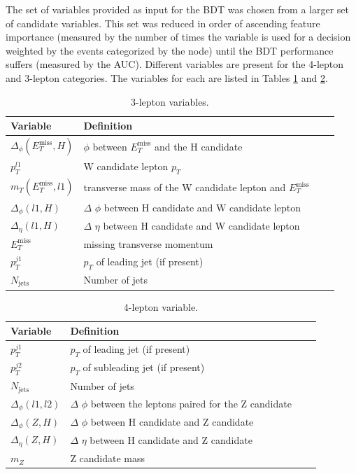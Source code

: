 The set of variables provided as input for the BDT was chosen from a larger set of candidate variables.
This set was reduced in order of ascending feature importance (measured by the number of times the variable is used for a decision weighted by the events categorized by the node) until the BDT performance suffers (measured by the AUC).
Different variables are present for the 4-lepton and 3-lepton categories.
The variables for each are listed in Tables \ref{tab:hmm3lepVars} and \ref{tab:hmm4lepVars}.

\begin{table}[htp]
\begin{center}
\begin{tabular}{l l l l}
\toprule
Variable & Definition \\
\midrule
 $\Delta_\phi(E_T^\text{miss},H)$ & $\phi$ between $E_T^\text{miss}$ and the H candidate \\
 $p_T^{l1}$ & W candidate lepton $p_T$ \\
 $m_T(E_T^\text{miss},l1)$ & transverse mass of the W candidate lepton and $E_T^\text{miss}$  \\
 $\Delta_\phi(l1,H)$ & $\Delta$ $\phi$ between H candidate and W candidate lepton \\
 $\Delta_\eta(l1,H)$ & $\Delta$ $\eta$ between H candidate and W candidate lepton \\
 $E_T^\text{miss}$ & missing transverse momentum \\
 $p_T^{j1}$ & $p_T$ of leading jet (if present) \\
 $N_\text{jets}$ & Number of jets \\
\bottomrule
\end{tabular}
\caption{3-lepton variables.}
\label{tab:hmm3lepVars}
\end{center}
\end{table}

\begin{table}[htp]
\begin{center}
\begin{tabular}{l l l l}
\toprule
Variable & Definition \\
\midrule
 $p_T^{j1}$ & $p_T$ of leading jet (if present) \\
 $p_T^{j2}$ & $p_T$ of subleading jet (if present) \\
 $N_\text{jets}$ & Number of jets \\
 $\Delta_\phi(l1,l2)$ & $\Delta$ $\phi$ between the leptons paired for the Z candidate \\
 $\Delta_\phi(Z,H)$ & $\Delta$ $\phi$ between H candidate and Z candidate \\
 $\Delta_\eta(Z,H)$ & $\Delta$ $\eta$ between H candidate and Z candidate \\
 $m_Z$ & Z candidate mass \\
\bottomrule
\end{tabular}
\caption{4-lepton variable.}
\label{tab:hmm4lepVars}
\end{center}
\end{table}

